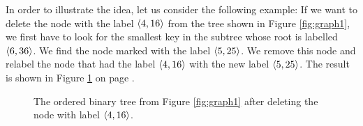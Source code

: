 In order to illustrate the idea, let us consider the following example: 
If we want to delete the node with the label  $\pair(4,16)$ from the tree shown in Figure
\ref{fig:graph1}, we first have to look for the smallest key in the subtree whose root is labelled
$\pair(6,36)$.  We find the node marked with the label $\pair(5,25)$.  We remove this node and
relabel the node that had the label $\pair(4,16)$ with the new label $\pair(5,25)$.  The result is
shown in Figure \ref{fig:graph2} on page \pageref{fig:graph2}.

\begin{figure}[!th]
  \centering
  \caption{The ordered binary tree from Figure  
          \ref{fig:graph1} after deleting the node with label $\pair(4,16)$.}
  \label{fig:graph2}
\end{figure}

